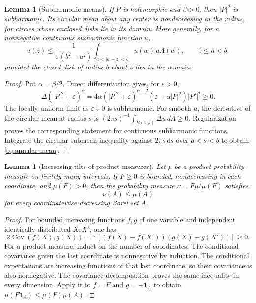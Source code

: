 \documentclass[11pt,a4paper]{article}
\numberwithin{equation}{section}
\newtheorem{lemma}[theorem]{Lemma}
\theoremstyle{remark}
\newcommand{\E}{\mathbb E}
\newcommand{\dd}{\,\mathrm d}
\newcommand{\ind}{\mathbf 1}
\begin{document}
\begin{lemma}[Subharmonic means]\label{lem:subharmonic}
If $P$ is holomorphic and $\beta>0$, then $|P|^\beta$ is
subharmonic. Its circular mean about any center is nondecreasing in
the radius, for circles whose enclosed disks lie in its domain.
More generally, for a nonnegative continuous subharmonic function $u$,
\begin{equation}\label{eq:annular-mean}
 u(z)\le\frac{1}{\pi(b^2-a^2)}
 \int_{a<|w-z|<b}u(w)\,dA(w),\qquad 0\le a<b,
\end{equation}
provided the closed disk of radius $b$ about $z$ lies in the domain.
\end{lemma}
\begin{proof}
Put $\alpha=\beta/2$. Direct differentiation gives, for $\varepsilon>0$,
\[
 \Delta(|P|^2+\varepsilon)^\alpha
 =4\alpha(|P|^2+\varepsilon)^{\alpha-2}
       (\varepsilon+\alpha|P|^2)|P'|^2\ge0.
\]
The locally uniform limit as $\varepsilon\downarrow0$ is subharmonic.
For smooth $u$, the derivative of the circular mean at radius $s$ is
$(2\pi s)^{-1}\int_{B(z,s)}\Delta u\,dA\ge0$.
Regularization proves the corresponding statement for continuous
subharmonic functions. Integrate the circular submean inequality
against $2\pi s\dd s$ over $a<s<b$ to obtain
\eqref{eq:annular-mean}.
\end{proof}

\begin{lemma}[Increasing tilts of product measures]\label{lem:association}
Let $\mu$ be a product probability measure on finitely many intervals.
If $F\ge0$ is bounded, nondecreasing in each coordinate, and
$\mu(F)>0$, then the probability measure $\nu=F\mu/\mu(F)$ satisfies
\[
 \nu(A)\le\mu(A)
\]
for every coordinatewise decreasing Borel set $A$.
\end{lemma}
\begin{proof}
For bounded increasing functions $f,g$ of one variable and independent
identically distributed $X,X'$, one has
\[
 2\operatorname{Cov}(f(X),g(X))
 =\E[(f(X)-f(X'))(g(X)-g(X'))]\ge0.
\]
For a product measure, induct on the number of coordinates.
The conditional covariance given the last coordinate is nonnegative
by induction. The conditional expectations are increasing functions
of that last coordinate, so their covariance is also nonnegative.
The covariance decomposition proves the same inequality in every
dimension. Apply it to $f=F$ and $g=-\ind_A$ to obtain
$\mu(F\ind_A)\le\mu(F)\mu(A)$.
\end{proof}
\end{document}
